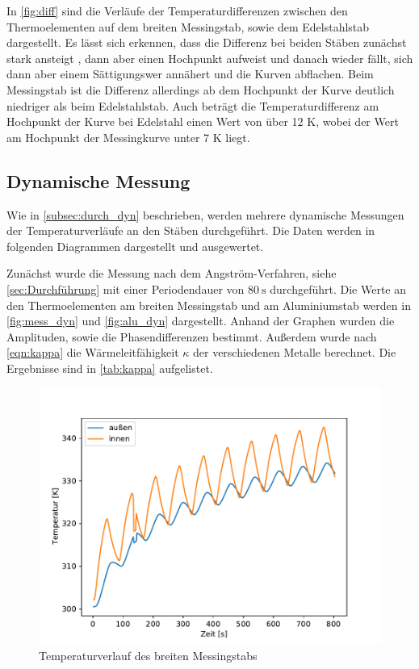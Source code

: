 In \autoref{fig:diff} sind die Verläufe der Temperaturdifferenzen zwischen den Thermoelementen auf dem breiten Messingstab, sowie dem Edelstahlstab dargestellt.
Es lässt sich erkennen, dass die Differenz bei beiden Stäben zunächst stark ansteigt , dann aber einen Hochpunkt aufweist und danach wieder fällt,
sich dann aber einem Sättigungswer annähert und die Kurven abflachen. 
Beim Messingstab ist die Differenz allerdings ab dem Hochpunkt der Kurve deutlich niedriger als beim Edelstahlstab.
Auch beträgt die Temperaturdifferenz am Hochpunkt der Kurve bei Edelstahl einen Wert von über 12 K, wobei der Wert am Hochpunkt der Messingkurve unter 7 K liegt.

\subsection{Dynamische Messung}
\label{aus_dyn}

Wie in \autoref{subsec:durch_dyn} beschrieben, werden mehrere dynamische Messungen der Temperaturverläufe an den Stäben durchgeführt. 
Die Daten werden in folgenden Diagrammen dargestellt und ausgewertet.

Zunächst wurde die Messung nach dem Angström-Verfahren, siehe \autoref{sec:Durchführung} mit einer Periodendauer von $\qty{80}{\second}$ durchgeführt.
Die Werte an den Thermoelementen am breiten Messingstab und am Aluminiumstab werden in \autoref{fig:mess_dyn} und \autoref{fig:alu_dyn} dargestellt.
Anhand der Graphen wurden die Amplituden, sowie die Phasendifferenzen bestimmt.
Außerdem wurde nach \autoref{eqn:kappa} die Wärmeleitfähigkeit $\kappa$ der verschiedenen Metalle berechnet. Die Ergebnisse sind in \autoref{tab:kappa} aufgelistet.
\begin{figure}[!htbp]
  \centering
  \includegraphics{content/dyn_80_mess.pdf}
  \caption{Temperaturverlauf des breiten Messingstabs}
  \label{fig:mess_dyn}
\end{figure}

